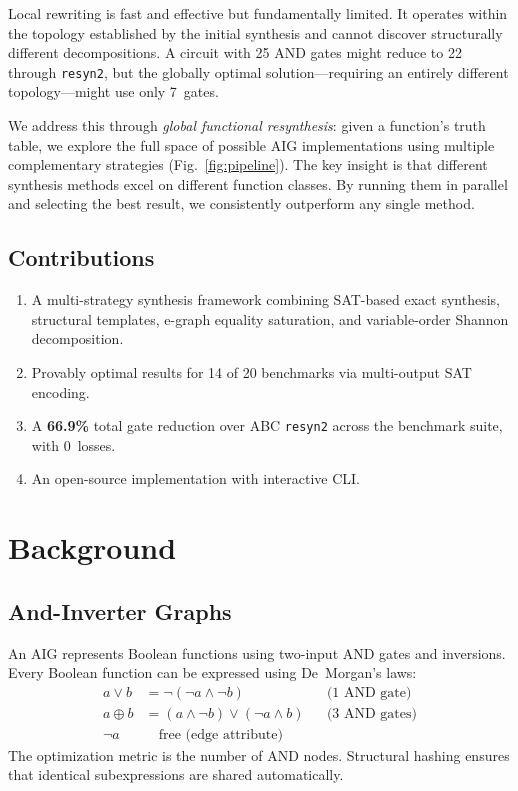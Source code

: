 \documentclass[conference,10pt]{IEEEtran}
\begin{document}
Local rewriting is fast and effective but fundamentally limited. It operates within the topology established by the initial synthesis and cannot discover structurally different decompositions. A circuit with 25 AND gates might reduce to 22 through \texttt{resyn2}, but the globally optimal solution---requiring an entirely different topology---might use only 7~gates.

We address this through \emph{global functional resynthesis}: given a function's truth table, we explore the full space of possible AIG implementations using multiple complementary strategies (Fig.~\ref{fig:pipeline}). The key insight is that different synthesis methods excel on different function classes. By running them in parallel and selecting the best result, we consistently outperform any single method.

\subsection{Contributions}

\begin{enumerate}
    \item A multi-strategy synthesis framework combining SAT-based exact synthesis, structural templates, e-graph equality saturation, and variable-order Shannon decomposition.
    \item Provably optimal results for 14 of 20 benchmarks via multi-output SAT encoding.
    \item A \textbf{66.9\%} total gate reduction over ABC \texttt{resyn2} across the benchmark suite, with 0~losses.
    \item An open-source implementation with interactive CLI.
\end{enumerate}

\section{Background}

\subsection{And-Inverter Graphs}

An AIG represents Boolean functions using two-input AND gates and inversions. Every Boolean function can be expressed using De~Morgan's laws:
\begin{align}
    a \lor b &= \lnot(\lnot a \land \lnot b) && \text{(1 AND gate)} \\
    a \oplus b &= (a \land \lnot b) \lor (\lnot a \land b) && \text{(3 AND gates)} \\
    \lnot a &\quad\text{free (edge attribute)} &&
\end{align}
The optimization metric is the number of AND nodes. Structural hashing ensures that identical subexpressions are shared automatically.
\end{document}
